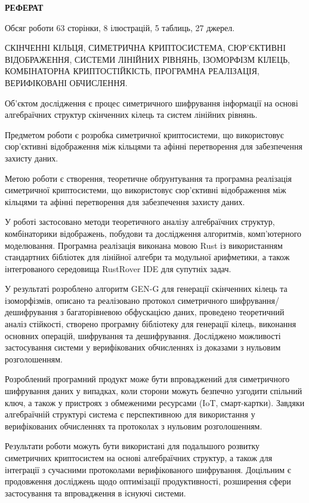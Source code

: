 \begin{center}
    \textbf{РЕФЕРАТ}
\end{center}

Обсяг роботи 63 сторінки, 8 ілюстрацій, 5 таблиць, 27 джерел.

СКІНЧЕННІ КІЛЬЦЯ, СИМЕТРИЧНА КРИПТОСИСТЕМА, СЮР’ЄКТИВНІ ВІДОБРАЖЕННЯ, СИСТЕМИ ЛІНІЙНИХ РІВНЯНЬ, ІЗОМОРФІЗМ КІЛЕЦЬ, КОМБІНАТОРНА КРИПТОСТІЙКІСТЬ, ПРОГРАМНА РЕАЛІЗАЦІЯ, ВЕРИФІКОВАНІ ОБЧИСЛЕННЯ.

Об’єктом дослідження є процес симетричного шифрування інформації на основі алгебраїчних структур скінченних кілець та систем лінійних рівнянь.

Предметом роботи є розробка симетричної криптосистеми, що використовує сюр’єктивні відображення між кільцями та афінні перетворення для забезпечення захисту даних.

Метою роботи є створення, теоретичне обґрунтування та програмна реалізація симетричної криптосистеми, що використовує сюр’єктивні відображення між кільцями та афінні перетворення для забезпечення захисту даних.

У роботі застосовано методи теоретичного аналізу алгебраїчних структур, комбінаторики відображень, побудови та дослідження алгоритмів, комп’ютерного моделювання.
Програмна реалізація виконана мовою Rust із використанням стандартних бібліотек для лінійної алгебри та модульної арифметики, а також інтегрованого середовища RustRover IDE для супутніх задач.

У результаті розроблено алгоритм GEN-G для генерації скінченних кілець та ізоморфізмів, описано та реалізовано протокол симетричного шифрування/дешифрування з багаторівневою обфускацією даних, проведено теоретичний аналіз стійкості, створено програмну бібліотеку для генерації кілець, виконання основних операцій, шифрування та дешифрування.
Досліджено можливості застосування системи у верифікованих обчисленнях із доказами з нульовим розголошенням.

Розроблений програмний продукт може бути впроваджений для симетричного шифрування даних у випадках, коли сторони можуть безпечно узгодити спільний ключ, а також у пристроях з обмеженими ресурсами (IoT, смарт-картки).
Завдяки алгебраїчній структурі система є перспективною для використання у верифікованих обчисленнях та протоколах з нульовим розголошенням.

Результати роботи можуть бути використані для подальшого розвитку симетричних криптосистем на основі алгебраїчних структур, а також для інтеграції з сучасними протоколами верифікованого шифрування.
Доцільним є продовження досліджень щодо оптимізації продуктивності, розширення сфери застосування та впровадження в існуючі системи.